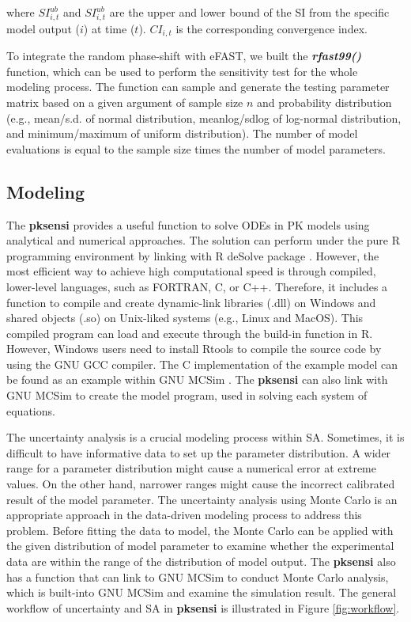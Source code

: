 \documentclass[preprint,12pt, a4paper]{elsarticle}
\begin{document}
where \(SI_{i,t}^{ub}\) and \(SI_{i,t}^{ub}\) are the upper and lower
bound of the SI from the specific model output (\(i\)) at time (\(t\)).
\(CI_{i,t}\) is the corresponding convergence index.

To integrate the random phase-shift with eFAST, we built the
\textbf{\textit{rfast99()}} function, which can be used to perform the sensitivity
test for the whole modeling process. The function can sample and generate the testing parameter matrix
based on a given argument of sample size \(n\) and probability
distribution (e.g., mean/s.d. of normal distribution, meanlog/sdlog of
log-normal distribution, and minimum/maximum of uniform distribution).
The number of model evaluations is equal to the sample size times the
number of model parameters.

\subsection{Modeling}

The \textbf{pksensi} provides a useful function to solve ODEs
in PK models using analytical and numerical approaches. The solution can
perform under the pure R programming environment by linking
with R deSolve package \cite{JSSv033i09}.
However, the most efficient way to achieve high computational speed is
through compiled, lower-level languages, such as FORTRAN, C, or C++. 
Therefore, it includes a function to compile and create
dynamic-link libraries (.dll) on Windows and shared objects (.so) on
Unix-liked systems (e.g., Linux and MacOS). This compiled program can
load and execute through the build-in function in R. However, Windows
users need to install Rtools to compile the source code by using the GNU
GCC compiler. The C implementation of the example model can be found as
an example within GNU MCSim \cite{bois2009gnu}. The \textbf{pksensi}
can also link with GNU MCSim to create the model program, used in
solving each system of equations.

The uncertainty analysis is a crucial modeling process within SA.
Sometimes, it is difficult to have informative data to set up the
parameter distribution. A wider range for a parameter distribution might
cause a numerical error at extreme values. On the other hand, narrower
ranges might cause the incorrect calibrated result of the model
parameter. The uncertainty analysis using Monte Carlo is an appropriate
approach in the data-driven modeling process to address this problem.
Before fitting the data to model, the Monte Carlo can be applied with
the given distribution of model parameter to examine whether the
experimental data are within the range of the distribution of model
output. The \textbf{pksensi} also has a function that can link to GNU MCSim
to conduct Monte Carlo analysis, which is built-into GNU MCSim and
examine the simulation result. The general workflow of uncertainty and
SA in \textbf{pksensi} is illustrated in Figure \ref{fig:workflow}.
\end{document}
